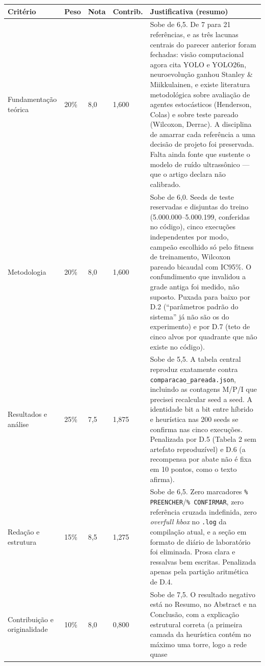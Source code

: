 \documentclass[11pt,a4paper]{article}
\begin{document}
\renewcommand{\arraystretch}{1.3}
\begin{longtable}{|p{4.1cm}|p{1.1cm}|p{1.1cm}|p{1.4cm}|p{6.6cm}|}
\hline
\textbf{Critério} & \textbf{Peso} & \textbf{Nota} & \textbf{Contrib.} & \textbf{Justificativa (resumo)} \\
\hline
\endhead
Fundamentação teórica & 20\% & 8,0 & 1,600 &
Sobe de 6,5. De 7 para 21 referências, e as três lacunas centrais do parecer anterior foram
fechadas: visão computacional agora cita YOLO e YOLO26n, neuroevolução ganhou Stanley \&
Miikkulainen, e existe literatura metodológica sobre avaliação de agentes estocásticos (Henderson,
Colas) e sobre teste pareado (Wilcoxon, Derrac). A disciplina de amarrar cada referência a uma
decisão de projeto foi preservada. Falta ainda fonte que sustente o modelo de ruído ultrassônico ---
que o artigo declara não calibrado. \\
\hline
Metodologia & 20\% & 8,0 & 1,600 &
Sobe de 6,0. Seeds de teste reservadas e disjuntas do treino (5.000.000--5.000.199, conferidas no
código), cinco execuções independentes por modo, campeão escolhido só pelo fitness de treinamento,
Wilcoxon pareado bicaudal com IC95\%. O confundimento que invalidou a grade antiga foi medido, não
suposto. Puxada para baixo por D.2 (``parâmetros padrão do sistema'' já não são os do experimento) e
por D.7 (teto de cinco alvos por quadrante que não existe no código). \\
\hline
Resultados e análise & 25\% & 7,5 & 1,875 &
Sobe de 5,5. A tabela central reproduz exatamente contra \texttt{comparacao\_pareada.json}, incluindo
as contagens M/P/I que precisei recalcular seed a seed. A identidade bit a bit entre híbrido e
heurística nas 200 seeds se confirma nas cinco execuções. Penalizada por D.5 (Tabela 2 sem artefato
reproduzível) e D.6 (a recompensa por abate não é fixa em 10 pontos, como o texto afirma). \\
\hline
Redação e estrutura & 15\% & 8,5 & 1,275 &
Sobe de 6,5. Zero marcadores \texttt{\% PREENCHER}/\texttt{\% CONFIRMAR}, zero referência cruzada
indefinida, zero \textit{overfull hbox} no \texttt{.log} da compilação atual, e a seção em formato de
diário de laboratório foi eliminada. Prosa clara e ressalvas bem escritas. Penalizada apenas pela
partição aritmética de D.4. \\
\hline
Contribuição e originalidade & 10\% & 8,0 & 0,800 &
Sobe de 7,5. O resultado negativo está no Resumo, no Abstract e na Conclusão, com a explicação
estrutural correta (a primeira camada da heurística contém no máximo uma torre, logo a rede quase

\end{longtable}
\end{document}
